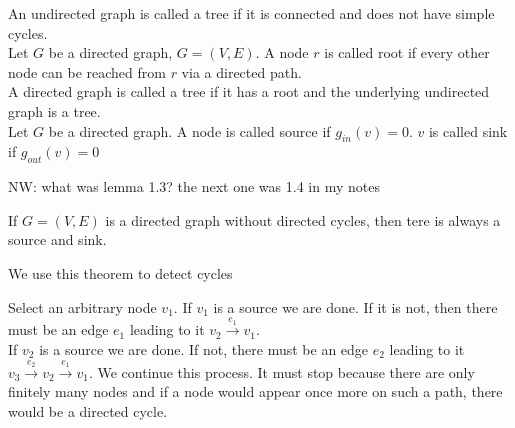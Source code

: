 \begin{definition}
    An undirected graph is called a tree if it is connected and does not have simple cycles.\\
    Let $G$ be a directed graph, $G=(V,E)$. A node $r$ is called root if every other node can be 
    reached from $r$ via a directed path. \\
    A directed graph is called a tree if it has a root and the underlying undirected graph is a tree. \\
    Let $G$ be a directed graph. A node is called source if $g_{in}(v) = 0$. $v$ is called sink if $g_{out}(v) = 0$
\end{definition}

\begin{lemma}
    NW: what was lemma 1.3? the next one was 1.4 in my notes
\end{lemma}
\begin{lemma}
    If $G=(V,E)$ is a directed graph without directed cycles, then tere is always a source and sink.
\end{lemma}
We use this theorem to detect cycles

\begin{prooof}
    Select an arbitrary node $v_{1}$. If $v_{1}$ is a source we are done. If it is not, then there must be an edge $e_{1}$
    leading to it $v_{2} \xrightarrow{e_{1}} v_{1}$. \\
    If $v_{2}$ is a source we are done. If not, there must be an edge $e_{2}$ leading to it
    $v_{3}  \xrightarrow{e_{2}} v_{2} \xrightarrow{e_{1}} v_{1}$.
    We continue this process. It must stop because there are only finitely many nodes and if a node would appear once more
    on such a path, there would be a directed cycle.
\end{prooof}







